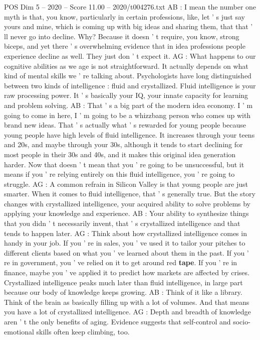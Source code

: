\begin{textsample}{POS Dim 5 – 2020 – Score 11.00 – 2020/t004276.txt}
AB : I mean the number one myth is that, you know, particularly in certain professions, like, let ' s just say yours and mine, which is coming up with big ideas and sharing them, that that ' ll never go into decline.
Why?
Because it doesn ' t require, you know, strong biceps, and yet there ' s overwhelming evidence that in idea professions people experience decline as well.
They just don ' t expect it.
AG : What happens to our cognitive abilities as we age is not straightforward.
It actually depends on what kind of mental skills we ' re talking about.
Psychologists have long distinguished between two kinds of intelligence : fluid and crystallized.
Fluid intelligence is your raw processing power.
It ' s basically your IQ, your innate capacity for learning and problem solving.
AB : That ' s a big part of the modern idea economy.
I ' m going to come in here, I ' m going to be a whizzbang person who comes up with brand new ideas.
That ' s actually what ' s rewarded for young people because young people have high levels of fluid intelligence.
It increases through your teens and 20s, and maybe through your 30s, although it tends to start declining for most people in their 30s and 40s, and it makes this original idea generation harder.
Now that doesn ' t mean that you ' re going to be unsuccessful, but it means if you ' re relying entirely on this fluid intelligence, you ' re going to struggle.
AG : A common refrain in Silicon Valley is that young people are just smarter.
When it comes to fluid intelligence, that ' s generally true.
But the story changes with crystallized intelligence, your acquired ability to solve problems by applying your knowledge and experience.
AB : Your ability to synthesize things that you didn ' t necessarily invent, that ' s crystallized intelligence and that tends to happen later.
AG : Think about how crystallized intelligence comes in handy in your job.
If you ' re in sales, you ' ve used it to tailor your pitches to different clients based on what you ' ve learned about them in the past.
If you ' re in government, you ' ve relied on it to get around red \textbf{tape}.
If you ' re in finance, maybe you ' ve applied it to predict how markets are affected by crises.
Crystallized intelligence peaks much later than fluid intelligence, in large part because our body of knowledge keeps growing.
AB : Think of it like a library.
Think of the brain as basically filling up with a lot of volumes.
And that means you have a lot of crystallized intelligence.
AG : Depth and breadth of knowledge aren ' t the only benefits of aging.
Evidence suggests that self-control and socio-emotional skills often keep climbing, too.

\end{textsample}
